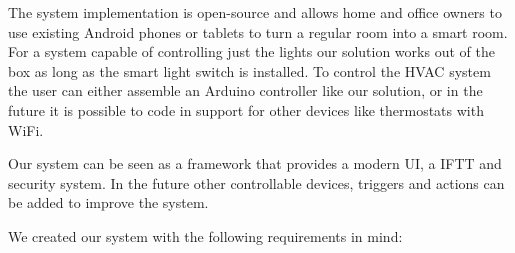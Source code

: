 The system implementation is open-source and allows home and office owners to use existing Android phones or tablets to turn a regular room into a smart room. For a system capable of controlling just the lights our solution works out of the box as long as the smart light switch is installed. To control the \ac{HVAC} system the user can either assemble an Arduino controller like our solution, or in the future it is possible to code in support for other devices like thermostats with \ac{WiFi}. 

Our system can be seen as a framework that provides a modern \ac{UI}, a \ac{IFTT} and security system. In the future other controllable devices, triggers and actions can be added to improve the system.



We created our system with the following requirements in mind:

